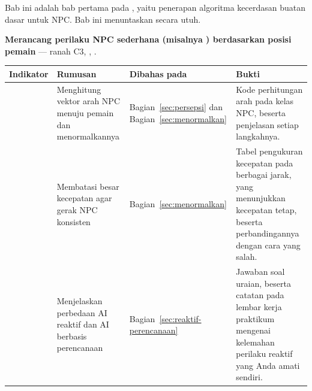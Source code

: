 \begin{subcpmkbox}
Bab ini adalah bab pertama pada , yaitu penerapan algoritma kecerdasan
buatan dasar untuk NPC. Bab ini menuntaskan  secara utuh.

\vspace{0.5em}
\textbf{ Merancang perilaku NPC sederhana (misalnya
) berdasarkan posisi pemain} --- ranah C3, ,
.

\vspace{0.5em}
{\setlength{\tabcolsep}{4pt}\footnotesize%
\begin{tabularx}{\textwidth}{@{}C{1.9cm} L{4.0cm} L{2.5cm} Y@{}}
\toprule
\headrow \textbf{Indikator} & \textbf{Rumusan} & \textbf{Dibahas pada} & \textbf{Bukti} \\
\midrule
{} & Menghitung vektor arah NPC menuju pemain dan menormalkannya &
Bagian~\ref{sec:persepsi} dan Bagian~\ref{sec:menormalkan} &
Kode perhitungan arah pada kelas NPC, beserta penjelasan setiap langkahnya. \\
\addlinespace
{} & Membatasi besar kecepatan agar gerak NPC konsisten &
Bagian~\ref{sec:menormalkan} &
Tabel pengukuran kecepatan pada berbagai jarak, yang menunjukkan kecepatan
tetap, beserta perbandingannya dengan cara yang salah. \\
\addlinespace
{} & Menjelaskan perbedaan AI reaktif dan AI berbasis perencanaan &
Bagian~\ref{sec:reaktif-perencanaan} &
Jawaban soal uraian, beserta catatan pada lembar kerja praktikum mengenai
kelemahan perilaku reaktif yang Anda amati sendiri. \\
\bottomrule
\end{tabularx}}
\end{subcpmkbox}
